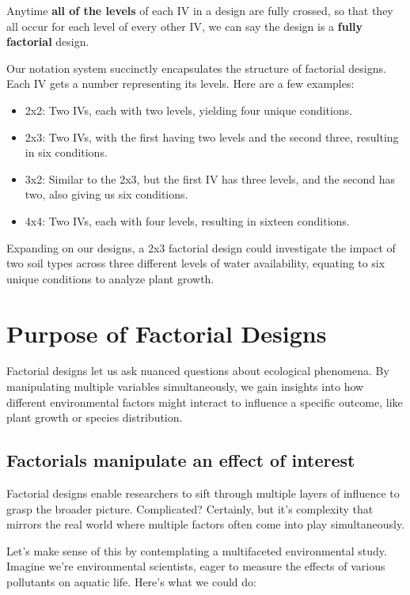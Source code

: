 \documentclass[
  letterpaper,
  DIV=11,
  numbers=noendperiod]{scrreprt}
\begin{document}
Anytime \textbf{all of the levels} of each IV in a design are fully
crossed, so that they all occur for each level of every other IV, we can
say the design is a \textbf{fully factorial} design.

Our notation system succinctly encapsulates the structure of factorial
designs. Each IV gets a number representing its levels. Here are a few
examples:

\begin{itemize}
\item
  2x2: Two IVs, each with two levels, yielding four unique conditions.
\item
  2x3: Two IVs, with the first having two levels and the second three,
  resulting in six conditions.
\item
  3x2: Similar to the 2x3, but the first IV has three levels, and the
  second has two, also giving us six conditions.
\item
  4x4: Two IVs, each with four levels, resulting in sixteen conditions.
\end{itemize}

Expanding on our designs, a 2x3 factorial design could investigate the
impact of two soil types across three different levels of water
availability, equating to six unique conditions to analyze plant growth.

\section{Purpose of Factorial
Designs}\label{purpose-of-factorial-designs}

Factorial designs let us ask nuanced questions about ecological
phenomena. By manipulating multiple variables simultaneously, we gain
insights into how different environmental factors might interact to
influence a specific outcome, like plant growth or species distribution.

\subsection{Factorials manipulate an effect of
interest}\label{factorials-manipulate-an-effect-of-interest}

Factorial designs enable researchers to sift through multiple layers of
influence to grasp the broader picture. Complicated? Certainly, but it's
complexity that mirrors the real world where multiple factors often come
into play simultaneously.

Let's make sense of this by contemplating a multifaceted environmental
study. Imagine we're environmental scientists, eager to measure the
effects of various pollutants on aquatic life. Here's what we could do:
\end{document}

